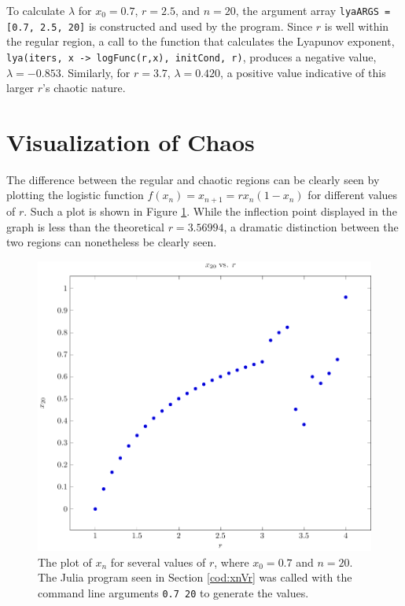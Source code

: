 \documentclass[a4paper]{article}
\begin{document}
\qq To calculate \( \lambda \) for \( x_0 = 0.7 \), \( r = 2.5 \), and \( n = 20
\), the argument array {\tt lyaARGS = [0.7, 2.5, 20]} is constructed and used by
the program. Since \( r \) is well within the regular region, a call to the
function that calculates the Lyapunov exponent, {\tt lya(iters, x -> logFunc(r,x),
  initCond, r)}, produces a negative value, \( \lambda = -0.853 \). Similarly,
for \( r = 3.7 \), \( \lambda = 0.420 \), a positive value indicative of this
larger \( r \)'s chaotic nature. 

\section{Visualization of Chaos}

\qq The difference between the regular and chaotic regions can be clearly seen
by plotting the logistic function \( f(x_n) = x_{n+1} = r x_n (1 - x_n) \) for different
values of \( r \). Such a plot is shown in Figure \ref{gph:xnVr}. While the
inflection point displayed in the graph is less than the theoretical \( r =
3.56994 \), a dramatic distinction between the two regions can nonetheless be
clearly seen.

\begin{figure}[H]
  \begin{center}
    \includegraphics[width=1.0\textwidth]{Plots/PartE/xnVr.pdf}
  \end{center}
  \caption{The plot of \( x_n \) for several values of \( r \), where \( x_0 =
    0.7 \) and \( n = 20 \). The Julia program seen in Section \ref{cod:xnVr}
    was called with the command line arguments {\tt 0.7 20} to generate the
    values.}
  \label{gph:xnVr}
\end{figure}
\end{document}
